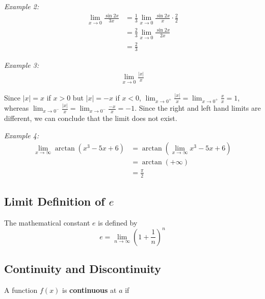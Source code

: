         \pagebreak
        \noindent \color{blue} \textit{Example 2:} \color{black} \\

        \begin{align*}
            \lim_{x\to0}\frac{\sin{2x}}{3x} &= \frac{1}{3}\lim_{x\to0}\frac{\sin{2x}}{x}\cdot\frac{2}{2} \\
            &= \frac{2}{3}\lim_{x\to0}\frac{\sin{2x}}{2x} \\
            &=\frac{2}{3}
        \end{align*}

        \noindent \color{blue} \textit{Example 3:} \color{black} \\

        \begin{align*}
            \lim_{x\to0}\frac{|x|}{x}
        \end{align*}

        \noindent Since $|x|=x$ if $x>0$ but $|x|=-x$ if $x<0$, $\lim_{x\to 0^+}\frac{|x|}{x}
        =\lim_{x\to0^+}\frac{x}{x}=1$, whereas
        $\lim_{x\to0^-}\frac{|x|}{x}=\lim_{x\to0^-}\frac{-x}{x}=-1$.
        Since the right and left hand limits are different, we can conclude that the
        limit does not exist.

        \noindent \color{blue} \textit{Example 4:} \color{black} \\
        \begin{align*}
            \lim_{x\to\infty}\arctan{(x^3-5x+6)} &= \arctan{(\lim_{x\to\infty}x^3-5x+6)} \\
            &= \arctan{(+\infty)} \\
            &= \frac{\pi}{2}
        \end{align*}



    \subsection{Limit Definition of $e$}
        The mathematical constant $e$ is defined by \\
        \begin{equation*}
            e=\lim_{n\to\infty}\left(1+\frac{1}{n}\right)^n
        \end{equation*}



    \subsection{Continuity and Discontinuity}
        A function $f(x)$ is \textbf{continuous} at $a$ if \\

